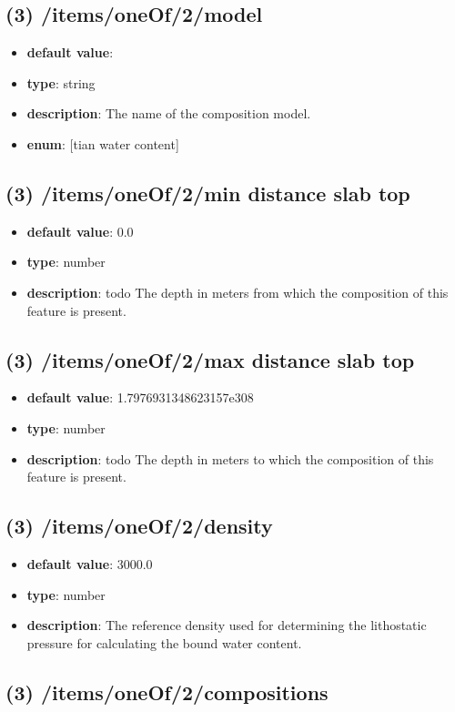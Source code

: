 \subsection{(3) /items/oneOf/2/model}
\begin{itemize}[leftmargin=3em]\item {\bf default value}: 
\item {\bf type}: string
\item {\bf description}: The name of the composition model.
\item {\bf enum}: [tian water content]\end{itemize}\subsection{(3) /items/oneOf/2/min distance slab top}
\begin{itemize}[leftmargin=3em]\item {\bf default value}: 0.0
\item {\bf type}: number
\item {\bf description}: todo The depth in meters from which the composition of this feature is present.
\end{itemize}\subsection{(3) /items/oneOf/2/max distance slab top}
\begin{itemize}[leftmargin=3em]\item {\bf default value}: 1.7976931348623157e308
\item {\bf type}: number
\item {\bf description}: todo The depth in meters to which the composition of this feature is present.
\end{itemize}\subsection{(3) /items/oneOf/2/density}
\begin{itemize}[leftmargin=3em]\item {\bf default value}: 3000.0
\item {\bf type}: number
\item {\bf description}: The reference density used for determining the lithostatic pressure for calculating the bound water content.
\end{itemize}\subsection{(3) /items/oneOf/2/compositions}
